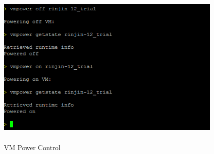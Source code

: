 \documentclass [12pt, a4paper, titlepage]{article}
\begin{document}
        \begin{figure}[H]
        \begin{center}
        \includegraphics[width=13cm,height=8cm]{png/vmpower.png}
        \end{center}
        \caption{VM Power Control}
        \label{vmpower}
        \end{figure}
\end{document}
